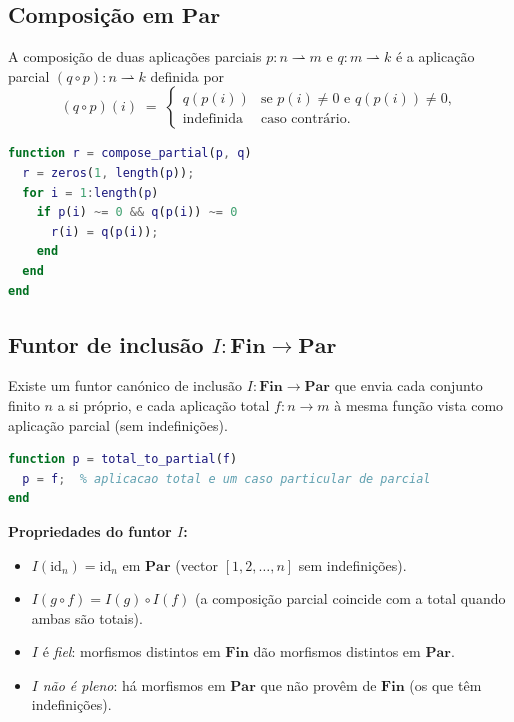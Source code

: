 \documentclass[12pt,a4paper]{article}
\newcommand{\catname}[1]{\mathbf{#1}}
\newcommand{\Fin}{\catname{Fin}}
\newcommand{\Par}{\catname{Par}}
\newcommand{\parto}{\rightharpoonup}  %
\begin{document}
\subsection{Composição em \texorpdfstring{$\Par$}{Par}}

A composição de duas aplicações parciais $p \colon n \parto m$ e $q \colon m \parto k$ é a aplicação parcial $(q \circ p) \colon n \parto k$ definida por
\[
  (q \circ p)(i) \;=\;
  \begin{cases}
    q(p(i)) & \text{se } p(i) \neq 0 \text{ e } q(p(i)) \neq 0,\\
    \text{indefinida} & \text{caso contrário.}
  \end{cases}
\]

\begin{lstlisting}[language=Matlab, caption={Composição de aplicações parciais}]
function r = compose_partial(p, q)
  r = zeros(1, length(p));
  for i = 1:length(p)
    if p(i) ~= 0 && q(p(i)) ~= 0
      r(i) = q(p(i));
    end
  end
end
\end{lstlisting}

\subsection{Funtor de inclusão \texorpdfstring{$I \colon \Fin \to \Par$}{I: Fin -> Par}}

Existe um funtor canónico de inclusão $I \colon \Fin \to \Par$ que envia cada conjunto finito $n$ a si próprio, e cada aplicação total $f \colon n \to m$ à mesma função vista como aplicação parcial (sem indefinições).

\begin{lstlisting}[language=Matlab, caption={Inclusão de $\Fin$ em $\Par$}]
function p = total_to_partial(f)
  p = f;  % aplicacao total e um caso particular de parcial
end
\end{lstlisting}

\noindent\textbf{Propriedades do funtor $I$:}
\begin{itemize}
  \item $I(\mathrm{id}_n) = \mathrm{id}_n$ em $\Par$ (vector $[1, 2, \ldots, n]$ sem indefinições).
  \item $I(g \circ f) = I(g) \circ I(f)$ (a composição parcial coincide com a total quando ambas são totais).
  \item $I$ é \emph{fiel}: morfismos distintos em $\Fin$ dão morfismos distintos em $\Par$.
  \item $I$ \emph{não é pleno}: há morfismos em $\Par$ que não provêm de $\Fin$ (os que têm indefinições).
\end{itemize}
\end{document}

